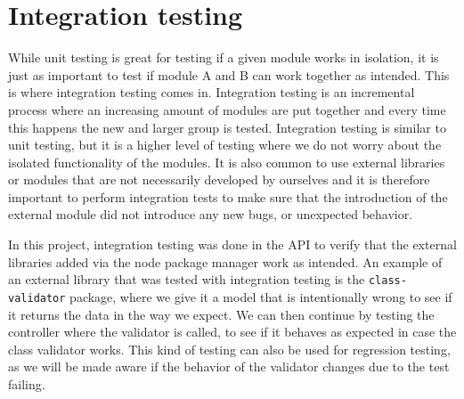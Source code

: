 \section{Integration testing}\label{sec:integrationTesting}
While unit testing is great for testing if a given module works in isolation, it is just as important to test if module A and B can work together as intended.
This is where integration testing comes in. 
Integration testing is an incremental process where an increasing amount of modules are put together and every time this happens the new and larger group is tested.
Integration testing is similar to unit testing, but it is a higher level of testing where we do not worry about the isolated functionality of the modules.
It is also common to use external libraries or modules that are not necessarily developed by ourselves and it is therefore important to perform integration tests to make sure that the introduction of the external module did not introduce any new bugs, or unexpected behavior.  

In this project, integration testing was done in the API to verify that the external libraries added via the node package manager work as intended.
An example of an external library that was tested with integration testing is the \texttt{class-validator} package, where we give it a model that is intentionally wrong to see if it returns the data in the way we expect.
We can then continue by testing the controller where the validator is called, to see if it behaves as expected in case the class validator works.
This kind of testing can also be used for regression testing, as we will be made aware if the behavior of the validator changes due to the test failing.
